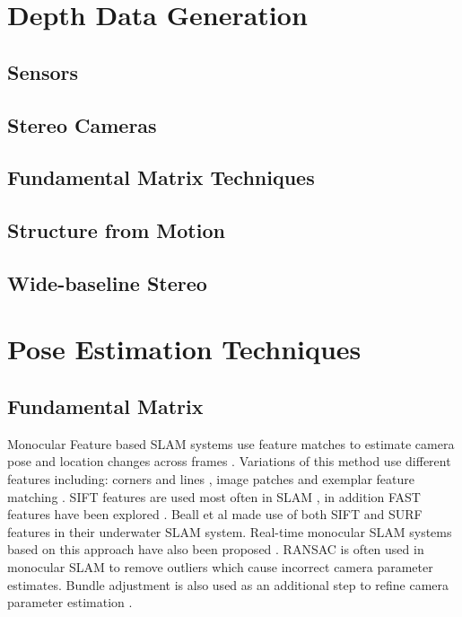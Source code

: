 \section{Depth Data Generation}
\subsection{Sensors}
\subsection{Stereo Cameras}
\subsection{Fundamental Matrix Techniques}
\subsection{Structure from Motion}
\subsection{Wide-baseline Stereo}

\section{Pose Estimation Techniques}
\subsection{Fundamental Matrix}

Monocular Feature based SLAM systems use feature matches to estimate camera pose and location changes across frames \cite{Davison02Simultaneous}. Variations of this method use different features including: corners and lines \cite{Jeong06Visual}, image patches \cite{Silveira08Efficient} and exemplar feature matching \cite{Chekhlov07Robust}. SIFT features are used most often in SLAM \cite{Jensfelt06Framework,Pollefeys08Detailed,Beall11Bundle,Eudes10Fast}, in addition FAST features have been explored \cite{Kundu10Realtime,Leelasawassuk133d,Konolige10View,Konolige08Frameslam}. Beall et al \cite{Beall11Bundle} made use of both SIFT and SURF features in their underwater SLAM system. Real-time monocular SLAM systems based on this approach have also been proposed \cite{Chekhlov07Robust,Pollefeys08Detailed}. RANSAC is often used in monocular SLAM \cite{Eudes10Fast,Kundu10Realtime,Konolige10View,Konolige08Frameslam,Pradeep13Monofusion} to remove outliers which cause incorrect camera parameter estimates. Bundle adjustment is also used as an additional step to refine camera parameter estimation \cite{Eudes10Fast}. 


